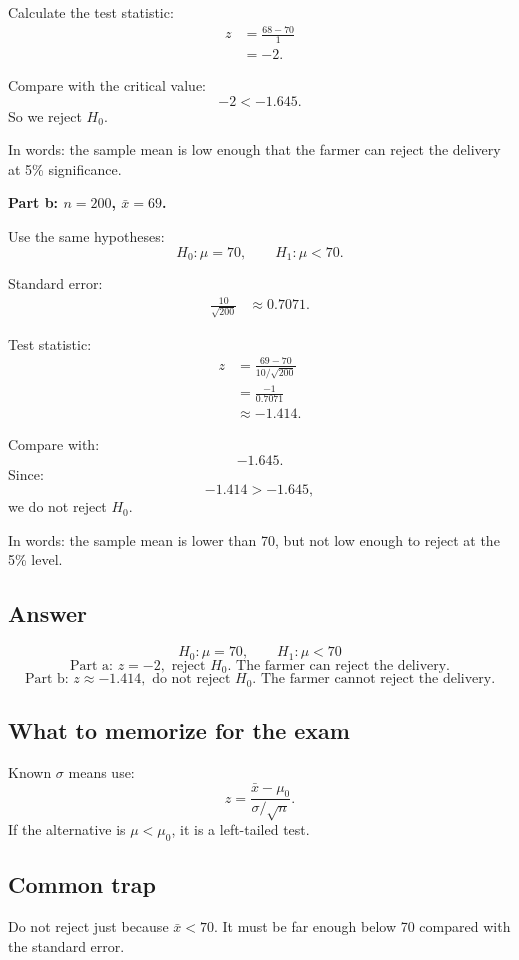 \documentclass[11pt,a4paper]{article}
\begin{document}
Calculate the test statistic:
\begin{align*}
z
&=\frac{68-70}{1}\\
&=-2.
\end{align*}

Compare with the critical value:
\[
-2<-1.645.
\]
So we reject \(H_0\).

In words: the sample mean is low enough that the farmer can reject the delivery at 5\% significance.

\textbf{Part b: \(n=200\), \(\bar{x}=69\).}

Use the same hypotheses:
\[
H_0:\mu=70,\qquad H_1:\mu<70.
\]

Standard error:
\begin{align*}
\frac{10}{\sqrt{200}}
&\approx 0.7071.
\end{align*}

Test statistic:
\begin{align*}
z
&=\frac{69-70}{10/\sqrt{200}}\\
&=\frac{-1}{0.7071}\\
&\approx -1.414.
\end{align*}

Compare with:
\[
-1.645.
\]
Since:
\[
-1.414>-1.645,
\]
we do not reject \(H_0\).

In words: the sample mean is lower than 70, but not low enough to reject at the 5\% level.

\subsection*{Answer}
\[
\boxed{H_0:\mu=70,\qquad H_1:\mu<70}
\]
\[
\boxed{\text{Part a: }z=-2,\text{ reject }H_0.\text{ The farmer can reject the delivery.}}
\]
\[
\boxed{\text{Part b: }z\approx -1.414,\text{ do not reject }H_0.\text{ The farmer cannot reject the delivery.}}
\]

\subsection*{What to memorize for the exam}
Known \(\sigma\) means use:
\[
z=\frac{\bar{x}-\mu_0}{\sigma/\sqrt{n}}.
\]
If the alternative is \(\mu<\mu_0\), it is a left-tailed test.

\subsection*{Common trap}
Do not reject just because \(\bar{x}<70\). It must be far enough below 70 compared with the standard error.
\end{document}
